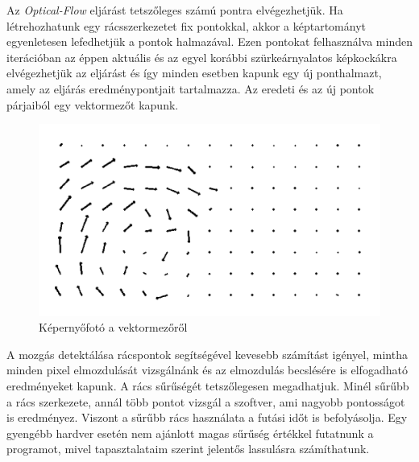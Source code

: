 
Az \textit{Optical-Flow} eljárást tetszőleges számú pontra elvégezhetjük. Ha létrehozhatunk egy rácsszerkezetet fix pontokkal, akkor a képtartományt egyenletesen lefedhetjük a pontok halmazával.
Ezen pontokat felhasználva minden iterációban az éppen aktuális és az egyel korábbi szürkeárnyalatos képkockákra elvégezhetjük az eljárást és így minden esetben kapunk egy új ponthalmazt, amely az eljárás eredménypontjait tartalmazza. Az eredeti és az új pontok párjaiból egy vektormezőt kapunk.

\begin{figure}[h]
\centering
\includegraphics[width=11.2truecm, height=6.3truecm]{images/vectorField_screenshot.png}
\caption{Képernyőfotó a vektormezőről}
\label{fig:vectorfield}
\end{figure}

A mozgás detektálása rácspontok segítségével kevesebb számítást igényel, mintha minden pixel elmozdulását vizsgálnánk és az elmozdulás becslésére is elfogadható eredményeket kapunk.
A rács sűrűségét tetszőlegesen megadhatjuk. Minél sűrűbb a rács szerkezete, annál több pontot vizsgál a szoftver, ami nagyobb pontosságot is eredményez. Viszont a sűrűbb rács használata a futási időt is befolyásolja. Egy gyengébb hardver esetén nem ajánlott magas sűrűség értékkel futatnunk a programot, mivel tapasztalataim szerint jelentős lassulásra számíthatunk.


